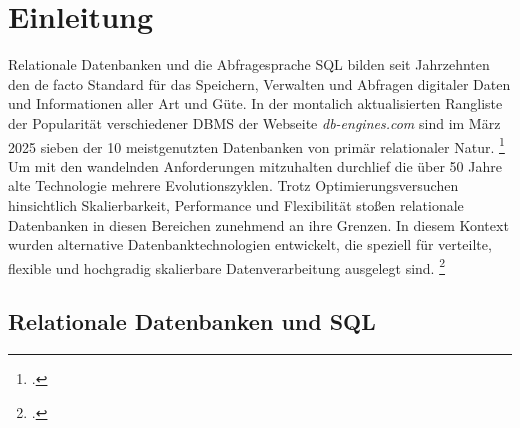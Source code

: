 \section{Einleitung}

Relationale Datenbanken und die Abfragesprache SQL bilden seit Jahrzehnten den de facto Standard für das Speichern, Verwalten und Abfragen digitaler Daten und Informationen aller Art und Güte. In der montalich aktualisierten Rangliste der Popularität verschiedener DBMS der Webseite \textit{db-engines.com} sind im März 2025 sieben der 10 meistgenutzten Datenbanken von primär relationaler Natur. \footcite{redgatesoftwareltd.DBEnginesRanking2025} Um mit den wandelnden Anforderungen mitzuhalten durchlief die über 50 Jahre alte Technologie mehrere Evolutionszyklen. Trotz Optimierungsversuchen hinsichtlich Skalierbarkeit, Performance und Flexibilität stoßen relationale Datenbanken 
in diesen Bereichen zunehmend an ihre Grenzen. In diesem Kontext wurden alternative Datenbanktechnologien entwickelt, die speziell für verteilte, flexible und hochgradig skalierbare Datenverarbeitung ausgelegt sind. \footcite[S. 13-17]{harrisonNextGenerationDatabases2015}




\subsection{Relationale Datenbanken und SQL}

